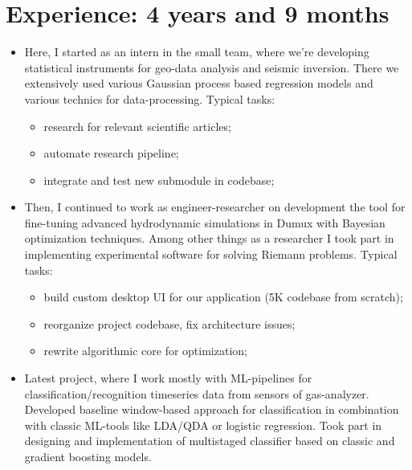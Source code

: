\documentclass[12pt,a4paper,roman]{moderncv}
\begin{document}
\section{Experience: 4 years and 9 months}
\begin{itemize}
\item Here, I started as an intern in the small team, where we're developing statistical instruments for geo-data analysis and seismic inversion. 
There we extensively used various Gaussian process based regression models and various technics for data-processing. \newline \newline
Typical tasks: 
 \begin{itemize}
  \item research for relevant scientific articles;
  \item automate research pipeline;
  \item integrate and test new submodule in codebase; \newline
 \end{itemize}
\item Then, I continued to work as engineer-researcher on development the tool for fine-tuning advanced 
hydrodynamic simulations in Dumux with Bayesian optimization techniques.  
Among other things as a researcher I took part in implementing experimental software for solving Riemann problems. \newline \newline
Typical tasks: 
 \begin{itemize}
  \item build custom desktop UI for our application (5K codebase from scratch);
  \item reorganize project codebase, fix architecture issues;
  \item rewrite algorithmic core for optimization; \newline
 \end{itemize}
\item Latest project, where I work mostly with ML-pipelines for classification/recognition timeseries data from sensors of gas-analyzer.
Developed baseline window-based approach for classification in combination with classic ML-tools like LDA/QDA or logistic regression. 
Took part in designing and implementation of multistaged classifier based on classic and gradient boosting models.
\newline \newline

\end{itemize}
\end{document}
